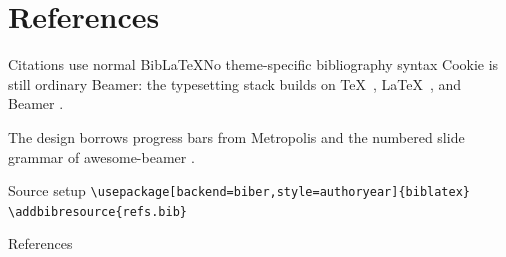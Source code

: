 \documentclass[aspectratio=169]{beamer}
\begin{document}
\section{References}

\begin{frame}{Citations use normal BibLaTeX}{No theme-specific bibliography syntax}
  Cookie is still ordinary Beamer: the typesetting stack builds on \TeX\ \parencite{knuth1984},
  \LaTeX\ \parencite{lamport1994}, and Beamer \parencite{tantau2025}.

  \vspace{.8em}
  The design borrows progress bars from Metropolis \parencite{metropolis} and the numbered
  slide grammar of awesome-beamer \parencite{awesomebeamer}.

  \vfill
  \begin{block}{Source setup}
    \texttt{\textbackslash usepackage[backend=biber,style=authoryear]\{biblatex\}}\\
    \texttt{\textbackslash addbibresource\{refs.bib\}}
  \end{block}
\end{frame}

\begin{frame}[allowframebreaks]{References}
  \printbibliography[heading=none]
\end{frame}
\end{document}
